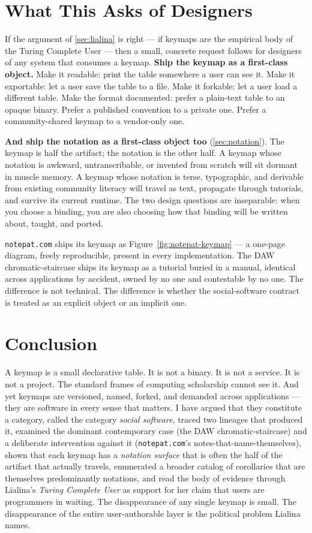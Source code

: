 \documentclass[10pt,letterpaper,twocolumn]{article}
\begin{document}
\section{What This Asks of Designers}
\label{sec:design}

If the argument of \textsection\ref{sec:lialina} is right --- if keymaps are the empirical body of the Turing Complete User --- then a small, concrete request follows for designers of any system that consumes a keymap. \textbf{Ship the keymap as a first-class object.} Make it readable: print the table somewhere a user can see it. Make it exportable: let a user save the table to a file. Make it forkable: let a user load a different table. Make the format documented: prefer a plain-text table to an opaque binary. Prefer a published convention to a private one. Prefer a community-shared keymap to a vendor-only one.

\textbf{And ship the notation as a first-class object too} (\textsection\ref{sec:notation}). The keymap is half the artifact; the notation is the other half. A keymap whose notation is awkward, untranscribable, or invented from scratch will sit dormant in muscle memory. A keymap whose notation is terse, typographic, and derivable from existing community literacy will travel as text, propagate through tutorials, and survive its current runtime. The two design questions are inseparable: when you choose a binding, you are also choosing how that binding will be written about, taught, and ported.

\texttt{notepat.com} ships its keymap as Figure~\ref{fig:notepat-keymap} --- a one-page diagram, freely reproducible, present in every implementation. The DAW chromatic-staircase ships its keymap as a tutorial buried in a manual, identical across applications by accident, owned by no one and contestable by no one. The difference is not technical. The difference is whether the social-software contract is treated as an explicit object or an implicit one.

\section{Conclusion}

A keymap is a small declarative table. It is not a binary. It is not a service. It is not a project. The standard frames of computing scholarship cannot see it. And yet keymaps are versioned, named, forked, and demanded across applications --- they are software in every sense that matters. I have argued that they constitute a category, called the category \emph{social software}, traced two lineages that produced it, examined the dominant contemporary case (the DAW chromatic-staircase) and a deliberate intervention against it (\texttt{notepat.com}'s notes-that-name-themselves), shown that each keymap has a \emph{notation surface} that is often the half of the artifact that actually travels, enumerated a broader catalog of corollaries that are themselves predominantly notations, and read the body of evidence through Lialina's \emph{Turing Complete User} as support for her claim that users are programmers in waiting. The disappearance of any single keymap is small. The disappearance of the entire user-authorable layer is the political problem Lialina names.
\end{document}
